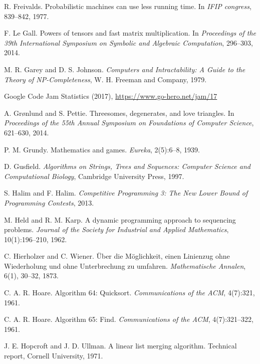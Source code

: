 \begin{thebibliography}{9}
  R. Freivalds.
  Probabilistic machines can use less running time.
  In \emph{IFIP congress}, 839--842, 1977.

  F. Le Gall.
  Powers of tensors and fast matrix multiplication.
  In \emph{Proceedings of the 39th International Symposium on Symbolic and Algebraic Computation},
  296--303, 2014.

  M. R. Garey and D. S. Johnson.
  \emph{Computers and Intractability:
  A Guide to the Theory of NP-Completeness},
  W. H. Freeman and Company, 1979.

  Google Code Jam Statistics (2017),
  \url{https://www.go-hero.net/jam/17}

  A. Grønlund and S. Pettie.
  Threesomes, degenerates, and love triangles.
  In \emph{Proceedings of the 55th Annual Symposium on Foundations of Computer Science},
  621--630, 2014.

  P. M. Grundy.
  Mathematics and games.
  \emph{Eureka}, 2(5):6--8, 1939.

  D. Gusfield.
  \emph{Algorithms on Strings, Trees and Sequences:
  Computer Science and Computational Biology},
  Cambridge University Press, 1997.


  S. Halim and F. Halim.
  \emph{Competitive Programming 3: The New Lower Bound of Programming Contests}, 2013.

  M. Held and R. M. Karp.
  A dynamic programming approach to sequencing problems.
  \emph{Journal of the Society for Industrial and Applied Mathematics}, 10(1):196--210, 1962.

  C. Hierholzer and C. Wiener.
  Über die Möglichkeit, einen Linienzug ohne Wiederholung und ohne Unterbrechung zu umfahren.
  \emph{Mathematische Annalen}, 6(1), 30--32, 1873.

  C. A. R. Hoare.
  Algorithm 64: Quicksort.
  \emph{Communications of the ACM}, 4(7):321, 1961.

  C. A. R. Hoare.
  Algorithm 65: Find.
  \emph{Communications of the ACM}, 4(7):321--322, 1961.

  J. E. Hopcroft and J. D. Ullman.
  A linear list merging algorithm.
  Technical report, Cornell University, 1971.


\end{thebibliography}
